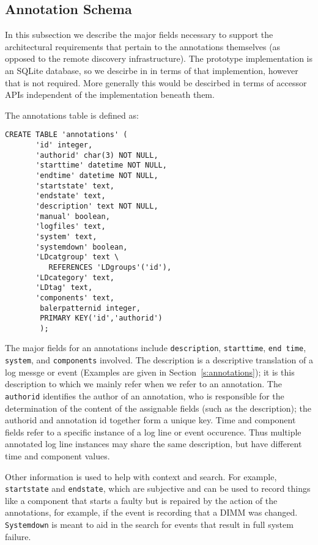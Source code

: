 \subsection{Annotation Schema}

In this subsection we describe the major fields necessary to support the
architectural requirements that pertain to the annotations themselves
(as opposed to the remote discovery infrastructure). The prototype
implementation is an SQLite database, so we descirbe in in terms
of that implemention, however that is not required. More generally
this would be descirbed in terms of accessor APIs independent of
the implementation beneath them.

The annotations table is defined as:
\begin{small}
\begin{verbatim}
CREATE TABLE 'annotations' (
       'id' integer,
       'authorid' char(3) NOT NULL,
       'starttime' datetime NOT NULL,
       'endtime' datetime NOT NULL,
       'startstate' text,
       'endstate' text,
       'description' text NOT NULL,
       'manual' boolean,
       'logfiles' text,
       'system' text,
       'systemdown' boolean,
       'LDcatgroup' text \
          REFERENCES 'LDgroups'('id'),
       'LDcategory' text,
       'LDtag' text,
       'components' text,
        balerpatternid integer,
        PRIMARY KEY('id','authorid')
        );
\end{verbatim}
\end{small}

The major fields for an annotations include \texttt{description}, \texttt{starttime}, \texttt{end time},
\texttt{system}, and \texttt{components} involved.
The description is a descriptive translation of a log messge or event (Examples
are given in Section~\ref{s:annotations}); it is this description to which we
mainly refer when we refer to an annotation.
The \texttt{authorid} identifies the author of an annotation, who
is responsible for the determination of the content of the assignable fields
(such as the description); the authorid and annotation id together form a unique key.
Time and component fields refer to a specific instance of a log line or event
occurence. Thus multiple annotated log line instances may share the same description,
but have different time and component values.

Other information is used to help with context and search.
For example, \texttt{startstate} and \texttt{endstate}, which
are subjective and can be used to record things like a component
that starts a faulty but is repaired by the action of the annotations,
for example, if the event is recording that a DIMM was changed.
\texttt{Systemdown} is meant to aid in the search for events that result
in full system failure.

